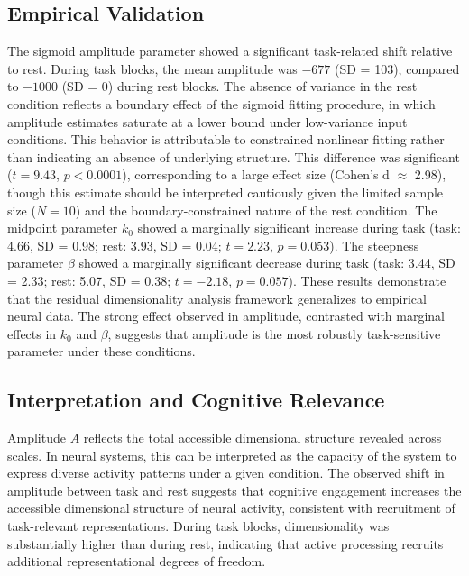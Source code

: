 \documentclass[11pt]{article}
\begin{document}
\subsection{Empirical Validation}

The sigmoid amplitude parameter showed a significant task-related shift relative to rest. During task blocks, the mean amplitude was $-677$ (SD = 103), compared to $-1000$ (SD = 0) during rest blocks. The absence of variance in the rest condition reflects a boundary effect of the sigmoid fitting procedure, in which amplitude estimates saturate at a lower bound under low-variance input conditions. This behavior is attributable to constrained nonlinear fitting rather than indicating an absence of underlying structure. This difference was significant ($t = 9.43$, $p < 0.0001$), corresponding to a large effect size (Cohen's d $\approx$ 2.98), though this estimate should be interpreted cautiously given the limited sample size ($N = 10$) and the boundary-constrained nature of the rest condition.
The midpoint parameter $k_0$ showed a marginally significant increase during task (task: 4.66, SD = 0.98; rest: 3.93, SD = 0.04; $t = 2.23$, $p = 0.053$). The steepness parameter $\beta$ showed a marginally significant decrease during task (task: 3.44, SD = 2.33; rest: 5.07, SD = 0.38; $t = -2.18$, $p = 0.057$).
These results demonstrate that the residual dimensionality analysis framework generalizes to empirical neural data. The strong effect observed in amplitude, contrasted with marginal effects in $k_0$ and $\beta$, suggests that amplitude is the most robustly task-sensitive parameter under these conditions.

\subsection{Interpretation and Cognitive Relevance}

Amplitude $A$ reflects the total accessible dimensional structure revealed across scales. In neural systems, this can be interpreted as the capacity of the system to express diverse activity patterns under a given condition. The observed shift in amplitude between task and rest suggests that cognitive engagement increases the accessible dimensional structure of neural activity, consistent with recruitment of task-relevant representations. During task blocks, dimensionality was substantially higher than during rest, indicating that active processing recruits additional representational degrees of freedom.
\end{document}
